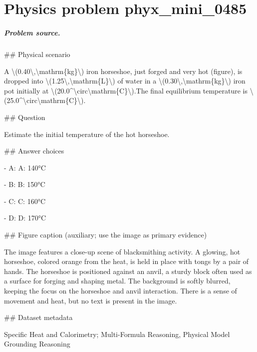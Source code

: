 
\chapter{Physics problem phyx\_mini\_0485}
\label{ch:PhyXMiniProblems_problem_phyx_mini_0485}

\paragraph{Problem source.}
\#\# Physical scenario

A \textbackslash{}(0.40\textbackslash{},\textbackslash{}mathrm\{kg\}\textbackslash{}) iron horseshoe, just forged and very hot (figure), is dropped into \textbackslash{}(1.25\textbackslash{},\textbackslash{}mathrm\{L\}\textbackslash{}) of water in a \textbackslash{}(0.30\textbackslash{},\textbackslash{}mathrm\{kg\}\textbackslash{}) iron pot initially at \textbackslash{}(20.0\textasciicircum{}\textbackslash{}circ\textbackslash{}mathrm\{C\}\textbackslash{}).The final equilibrium temperature is \textbackslash{}(25.0\textasciicircum{}\textbackslash{}circ\textbackslash{}mathrm\{C\}\textbackslash{}).

\#\# Question

Estimate the initial temperature of the hot horseshoe.

\#\# Answer choices

- A: A: 140°C

- B: B: 150°C

- C: C: 160°C

- D: D: 170°C

\#\# Figure caption (auxiliary; use the image as primary evidence)

The image features a close-up scene of blacksmithing activity. A glowing, hot horseshoe, colored orange from the heat, is held in place with tongs by a pair of hands. The horseshoe is positioned against an anvil, a sturdy block often used as a surface for forging and shaping metal. The background is softly blurred, keeping the focus on the horseshoe and anvil interaction. There is a sense of movement and heat, but no text is present in the image.

\#\# Dataset metadata

Specific Heat and Calorimetry; Multi-Formula Reasoning, Physical Model Grounding Reasoning

